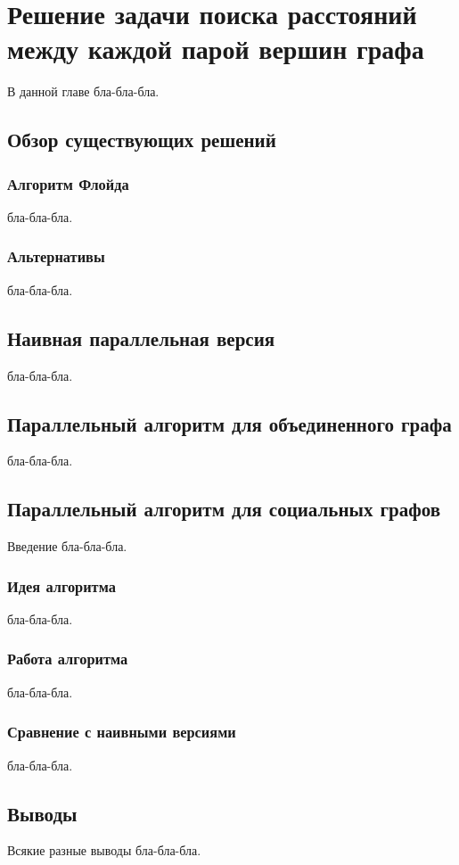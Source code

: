 \chapter{Решение задачи поиска расстояний между каждой парой вершин графа}

\label{chapSVD}

В данной главе бла-бла-бла.

\FloatBarrier
\section{Обзор существующих решений}

\subsection{Алгоритм Флойда}
бла-бла-бла.

\FloatBarrier
\subsection{Альтернативы}
бла-бла-бла.

\FloatBarrier
\section{Наивная параллельная версия}
бла-бла-бла.

\FloatBarrier
\section{Параллельный алгоритм для объединенного графа}
бла-бла-бла.

\FloatBarrier
\section{Параллельный алгоритм для социальных графов}
Введение бла-бла-бла.

\FloatBarrier
\subsection{Идея алгоритма}
бла-бла-бла.

\FloatBarrier
\subsection{Работа алгоритма}
бла-бла-бла.

\FloatBarrier
\subsection{Сравнение с наивными версиями}
бла-бла-бла.

\FloatBarrier
\section{Выводы}
Всякие разные выводы бла-бла-бла.

\FloatBarrier
